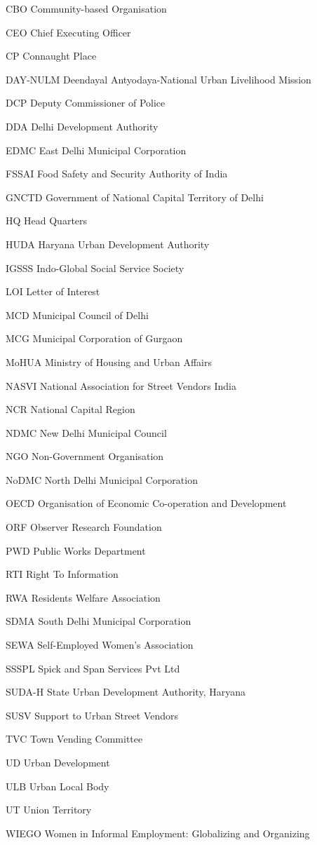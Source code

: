 \documentclass[a4paper, 12pt, twoside]{article}
\begin{document}
\begin{abbrv}[nosep]

    \item[CBO]			Community-based Organisation
	\item[CEO]			Chief Executing Officer
        	\item[CP]				Connaught Place
        	\item[DAY-NULM]		Deendayal Antyodaya-National Urban Livelihood Mission
        	\item[DCP]			Deputy Commissioner of Police
        	\item[DDA]			Delhi Development Authority
        	\item[EDMC]			East Delhi Municipal Corporation
        	\item[FSSAI]			Food Safety and Security Authority of India
	\item[GNCTD]			Government of National Capital Territory of Delhi
	\item[HQ]				Head Quarters
	\item[HUDA]			Haryana Urban Development Authority
	\item[IGSSS]			Indo-Global Social Service Society
	\item[LOI]				Letter of Interest
	\item[MCD]			Municipal Council of Delhi
	\item[MCG]			Municipal Corporation of Gurgaon
	\item[MoHUA]			Ministry of Housing and Urban Affairs
	\item[NASVI]			National Association for Street Vendors India
	\item[NCR]			National Capital Region
	\item[NDMC]			New Delhi Municipal Council
	\item[NGO]			Non-Government Organisation
	\item[NoDMC]			North Delhi Municipal Corporation
	\item[OECD]			Organisation of Economic Co-operation and Development
	\item[ORF]			Observer Research Foundation
	\item[PWD]			Public Works Department
	\item[RTI]				Right To Information
	\item[RWA]			Residents Welfare Association
	\item[SDMA]			South Delhi Municipal Corporation
	\item[SEWA]			Self-Employed Women's Association
	\item[SSSPL]			Spick and Span Services Pvt Ltd
	\item[SUDA-H]			State Urban Development Authority, Haryana
	\item[SUSV]			Support to Urban Street Vendors
	\item[TVC]			Town Vending Committee
	\item[UD]				Urban Development
	\item[ULB]				Urban Local Body
	\item[UT]				Union Territory
	\item[WIEGO]			Women in Informal Employment: Globalizing and Organizing


\end{abbrv}
\end{document}
